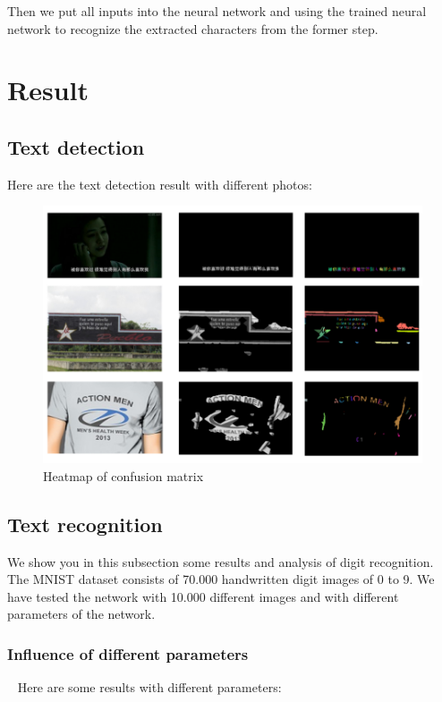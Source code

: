 \documentclass[paper=a4, french, 11pt]{scrartcl}
\begin{document}
Then we put all inputs into the neural network and using the trained neural network to recognize the extracted characters from the former step.

\section{Result}

\subsection{Text detection}
Here are the text detection result with different photos:

\begin{figure}[h]
\begin{center}
   \includegraphics[width=1.0\linewidth]{results.png}
\end{center}
\vspace{-3ex}
\caption{Heatmap of confusion matrix}
\label{fig:heatmap}
\end{figure}

\subsection{Text recognition}
We show you in this subsection some results and analysis of digit recognition. The MNIST dataset consists of 70.000 handwritten digit images of 0 to 9. We have tested the network with 10.000 different images and with different parameters of the network.

\subsubsection{Influence of different parameters}
~\indent
Here are some results with different parameters:
\end{document}
